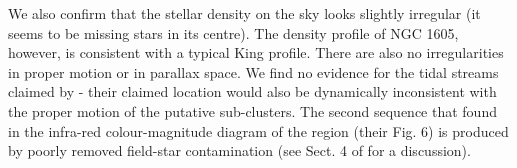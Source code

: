 \documentclass[RNAAS]{aastex631}
\begin{document}
We also confirm that the stellar density on the sky looks slightly irregular (it seems to be missing stars in its centre). The density profile of NGC 1605, however, is consistent with a typical King profile. There are also no irregularities in proper motion or in parallax space. We find no evidence for the tidal streams claimed by \citet{Camargo2021} - their claimed location would also be dynamically inconsistent with the proper motion of the putative sub-clusters.
The second sequence that \citet{Camargo2021} found in the infra-red colour-magnitude diagram of the region (their Fig. 6) is produced by poorly removed field-star contamination (see Sect. 4 of \citealt{CantatAnders2020} for a discussion).
\end{document}
